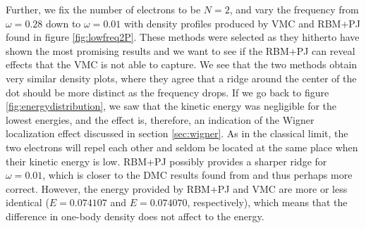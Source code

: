 Further, we fix the number of electrons to be $N=2$, and vary the frequency from $\omega=0.28$ down to $\omega=0.01$ with density profiles produced by VMC and RBM+PJ found in figure \eqref{fig:lowfreq2P}. These methods were selected as they hitherto have shown the most promising results and we want to see if the RBM+PJ can reveal effects that the VMC is not able to capture. We see that the two methods obtain very similar density plots, where they agree that a ridge around the center of the dot should be more distinct as the frequency drops. If we go back to figure \eqref{fig:energydistribution}, we saw that the kinetic energy was negligible for the lowest energies, and the effect is, therefore, an indication of the Wigner localization effect discussed in section \ref{sec:wigner}. As in the classical limit, the two electrons will repel each other and seldom be located at the same place when their kinetic energy is low. RBM+PJ possibly provides a sharper ridge for $\omega=0.01$, which is closer to the DMC results found from \citet{hogberget_quantum_2013} and thus perhaps more correct. However, the energy provided by RBM+PJ and VMC are more or less identical ($E=0.074107$ and $E=0.074070$, respectively), which means that the difference in one-body density does not affect to the energy.

